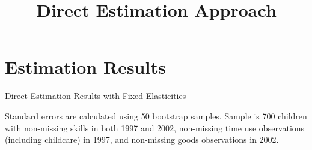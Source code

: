 \documentclass{article}
\title{Direct Estimation Approach}
\author{}
\begin{document}
\maketitle
\section*{Estimation Results}



\begin{table}\footnotesize\caption{Direct Estimation Results with Fixed Elasticities}
    \begin{center}
        
        \captionsetup{width=0.7\textwidth}
        \caption*{Standard errors are calculated using 50 bootstrap samples. Sample is 700 children with non-missing skills in both 1997 and 2002, non-missing time use observations (including childcare) in 1997, and non-missing goods observations in 2002.}
    \end{center}
    \end{table}
\end{document}
